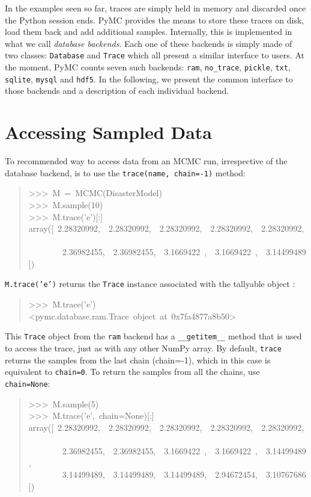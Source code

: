 

In the examples seen so far, traces are simply held in memory and discarded once
the Python session ends. PyMC provides the means to store these traces on disk,
load them back and add additional samples. Internally, this is implemented in
what we call \emph{database backends}. Each one of these backends is simply made
of two classes: \texttt{Database} and \texttt{Trace} which all present a similar
interface to users.
At the moment, PyMC counts seven such backends: \texttt{ram}, \texttt{no{\_}trace},
\texttt{pickle}, \texttt{txt}, \texttt{sqlite}, \texttt{mysql} and \texttt{hdf5}.
In the following, we present the common interface to those backends and a
description of each individual backend.



\hypertarget{accessing-sampled-data}{}
\section{Accessing Sampled Data}
\label{accessing-sampled-data}

To recommended way to access data from an MCMC run, irrespective of the
database backend, is to use the \texttt{trace(name, chain=-1)} method:
\begin{quote}{\ttfamily \raggedright \noindent
>{}>{}>~M~=~MCMC(DisasterModel)~\\
>{}>{}>~M.sample(10)~\\
>{}>{}>~M.trace('e'){[}:{]}~\\
array({[}~2.28320992,~~2.28320992,~~2.28320992,~~2.28320992,~~2.28320992,~\\
~~~~~~~~2.36982455,~~2.36982455,~~3.1669422~,~~3.1669422~,~~3.14499489{]})
}\end{quote}

\texttt{M.trace('e')} returns the \texttt{Trace} instance associated with the tallyable
object :
\begin{quote}{\ttfamily \raggedright \noindent
>{}>{}>~M.trace('e')~\\
<pymc.database.ram.Trace~object~at~0x7fa4877a8b50>
}\end{quote}

This \texttt{Trace} object from the \texttt{ram} backend has a \texttt{{\_}{\_}getitem{\_}{\_}} method
that is used to access the trace, just as with any other NumPy array.
By default, \texttt{trace} returns the samples from
the last chain (chain=-1), which in this case is equivalent to \texttt{chain=0}. To
return the samples from all the chains, use \texttt{chain=None}:
\begin{quote}{\ttfamily \raggedright \noindent
>{}>{}>~M.sample(5)~\\
>{}>{}>~M.trace('e',~chain=None){[}:{]}~\\
array({[}~2.28320992,~~2.28320992,~~2.28320992,~~2.28320992,~~2.28320992,~\\
~~~~~~~~2.36982455,~~2.36982455,~~3.1669422~,~~3.1669422~,~~3.14499489,~\\
~~~~~~~~3.14499489,~~3.14499489,~~3.14499489,~~2.94672454,~~3.10767686{]})
}\end{quote}



